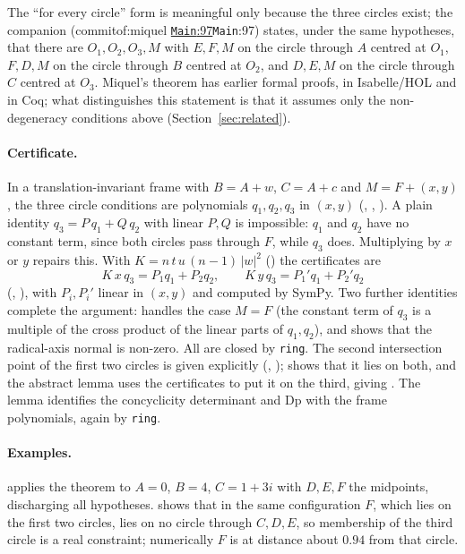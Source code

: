 \documentclass[11pt]{article}
\theoremstyle{definition}
\theoremstyle{remark}
\newcommand{\lean}[1]{\texttt{#1}}
\newcommand{\commitof}[1]{\csname commitof:#1\endcsname}
\newcommand{\repo}[1]{https://github.com/jpbald93/#1}
\newcommand{\src}[4]{\ifcsname commitof:#1\endcsname
  \href{\repo{#1}/blob/\commitof{#1}/#2/#3.lean\#L#4}{\texttt{#3}:#4}\else\texttt{#3}:#4\fi}
\begin{document}
The ``for every circle'' form is meaningful only because the three circles exist; the companion
 (\src{miquel}{Miquel}{Main}{97}) states, under the same hypotheses,
that there are $O_1,O_2,O_3,M$ with $E,F,M$ on the circle through $A$ centred at $O_1$, $F,D,M$ on
the circle through $B$ centred at $O_2$, and $D,E,M$ on the circle through $C$ centred at $O_3$.
Miquel's theorem has earlier formal proofs, in Isabelle/HOL and in Coq; what distinguishes this
statement is that it assumes only the non-degeneracy conditions above (Section~\ref{sec:related}).

\paragraph{Certificate.} In a translation-invariant frame with $B=A+w$, $C=A+c$ and $M=F+(x,y)$,
the three circle conditions are polynomials $q_1,q_2,q_3$ in $(x,y)$ (, ,
). A plain identity $q_3=P\,q_1+Q\,q_2$ with linear $P,Q$ is impossible: $q_1$ and
$q_2$ have no constant term, since both circles pass through $F$, while $q_3$ does. Multiplying by
$x$ or $y$ repairs this. With $K=n\,t\,u\,(n-1)\,|w|^2$ () the certificates are
\[
K\,x\,q_3=P_1q_1+P_2q_2,\qquad K\,y\,q_3=P_1'q_1+P_2'q_2
\]
(, ), with $P_i,P_i'$ linear in $(x,y)$ and computed by
SymPy. Two further identities complete the argument:  handles the case $M=F$
(the constant term of $q_3$ is a multiple of the cross product of the linear parts of $q_1,q_2$),
and  shows that the radical-axis normal is non-zero. All are closed by
\lean{ring}. The second intersection point of the first two circles is given explicitly
(, );  shows that it lies on both, and the
abstract lemma  uses the certificates to put it on the third, giving
. The lemma  identifies the concyclicity determinant
 and $\mathrm{Dp}$ with the frame polynomials, again by \lean{ring}.

\paragraph{Examples.}  applies the theorem to $A=0$, $B=4$,
$C=1+3i$ with $D,E,F$ the midpoints, discharging all hypotheses. 
shows that in the same configuration $F$, which lies on the first two circles, lies on no circle
through $C,D,E$, so membership of the third circle is a real constraint; numerically $F$ is at
distance about $0.94$ from that circle.
\end{document}

